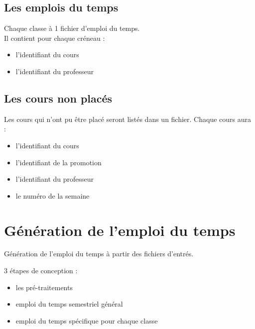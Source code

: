\documentclass{beamer}
\begin{document}
\subsection{Les emplois du temps}
\begin {frame}
Chaque classe à 1 fichier d'emploi du temps.\\
Il contient pour chaque créneau : 
\begin {itemize}
\item l'identifiant du cours
\item l'identifiant du professeur
\end{itemize}
\end{frame}

\subsection{Les cours non placés}
\begin{frame}
Les cours qui n'ont pu être placé seront listés dans un fichier.
Chaque cours aura : 
\begin{itemize}
\item l'identifiant du cours
\item l'identifiant de la promotion
\item l'identifiant du professeur
\item le numéro de la semaine
\end{itemize}
\end{frame}

\section{Génération de l'emploi du temps}
\begin {frame}
Génération de l'emploi du temps à partir des fichiers d'entrés.

3 étapes de conception : 
\begin{itemize}
\item les pré-traitements
\item emploi du temps semestriel général
\item emploi du temps spécifique pour chaque classe
\end{itemize}
\end{frame}
\end{document}
